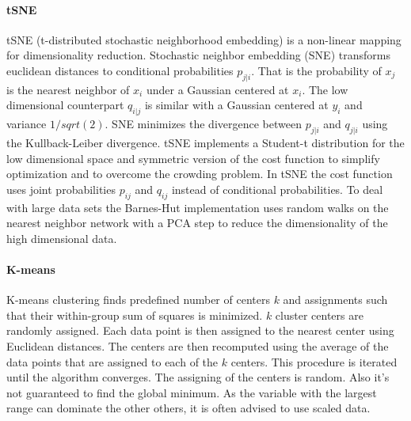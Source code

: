 \documentclass[11pt, a4paper]{article}\usepackage[]{graphicx}\usepackage[]{color}
\begin{document}
\paragraph{tSNE}
 tSNE (t-distributed stochastic neighborhood embedding) is a non-linear mapping \citet{an2013barnes} for dimensionality reduction. Stochastic neighbor embedding (SNE) transforms euclidean distances to conditional probabilities $p_{j|i}$. That is the probability of \(x_j\) is the nearest neighbor of $x_i$ under a Gaussian centered at $x_i$. The low dimensional counterpart $q_{i|j}$ is similar with a Gaussian centered at $y_i$ and variance $1/sqrt(2)$. SNE minimizes the divergence between $p_{j|i}$ and $q_{j|i}$ using the Kullback-Leiber divergence. 
tSNE implements a Student-t distribution for the low dimensional space and symmetric version of the cost function to simplify optimization and to overcome the crowding problem.
In tSNE the cost function uses joint probabilities $p_{ij}$ and $q_{ij}$  instead of conditional probabilities. 
To deal with large data sets the Barnes-Hut implementation uses random walks on the nearest neighbor network with a PCA step to reduce the dimensionality of the high dimensional data.

\paragraph{K-means}
K-means clustering finds predefined number of centers $k$ and assignments \citep{hartigan1979algorithm} such that their within-group sum of squares is minimized. $k$ cluster centers are randomly assigned.
Each data point is then assigned to the nearest center using Euclidean distances. The centers are then recomputed using the average of the data points that are assigned to each of the $k$ centers. This procedure is iterated until the algorithm converges. The assigning of the centers is random. Also it's not guaranteed to find the global minimum.  As the variable with the largest range can dominate the other others, it is often advised to use scaled data. 
\end{document}
